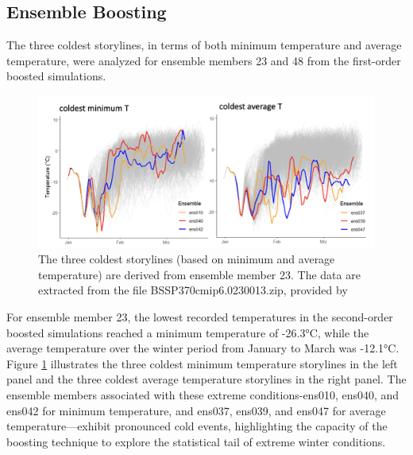 \documentclass[
]{krantz}
\begin{document}
\subsection{Ensemble Boosting}\label{ensemble-boosting-1}

The three coldest storylines, in terms of both minimum temperature and average temperature, were analyzed for ensemble members 23 and 48 from the first-order boosted simulations.

\begin{figure}

{\centering \includegraphics[width=0.9\linewidth]{work/03-coldex/figures/boosting results23} 

}

\caption{The three coldest storylines (based on minimum and average temperature) are derived from ensemble member 23. The data are extracted from the file BSSP370cmip6.0230013.zip, provided by \citet{sippel2024}}\label{fig:boosting-result23}
\end{figure}

For ensemble member 23, the lowest recorded temperatures in the second-order boosted simulations reached a minimum temperature of -26.3°C, while the average temperature over the winter period from January to March was -12.1°C. Figure \ref{fig:boosting-result23} illustrates the three coldest minimum temperature storylines in the left panel and the three coldest average temperature storylines in the right panel. The ensemble members associated with these extreme conditions-ens010, ens040, and ens042 for minimum temperature, and ens037, ens039, and ens047 for average temperature---exhibit pronounced cold events, highlighting the capacity of the boosting technique to explore the statistical tail of extreme winter conditions.
\end{document}
